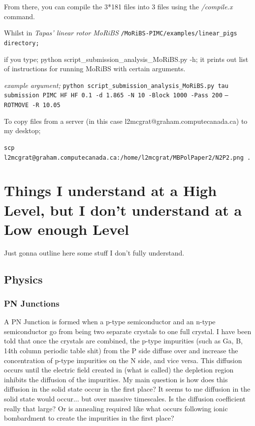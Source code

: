 \documentclass{article}
\newcounter{subsubsubsection}[subsubsection]
\begin{document}
From there, you can compile the 3*181 files into 3 files using the \textit{/compile.x} command.  


Whilst in \textit{Tapas' linear rotor MoRiBS} \texttt{/MoRiBS-PIMC/examples/linear\_pigs directory;} 

if you type; python script\_submission\_analysis\_MoRiBS.py -h;  
it prints out list of instructions for running MoRiBS with certain arguments.

\textit{example argument;}  \texttt{python script\_submission\_analysis\_MoRiBS.py tau submission PIMC HF HF 0.1 -d 1.865 -N 10 -Block 1000 -Pass 200}
\texttt{--ROTMOVE -R 10.05}

\vspace{0.5cm}

To copy files from a server (in this case l2mcgrat@graham.computecanada.ca) to my desktop;

\texttt{scp l2mcgrat@graham.computecanada.ca:/home/l2mcgrat/MBPolPaper2/N2P2.png .}


\section{Things I understand at a High Level, but I don't understand at a Low enough Level}

Just gonna outline here some stuff I don't fully understand.

\subsection{Physics}

\subsubsection{PN Junctions}

A PN Junction is formed when a p-type semiconductor and an n-type semiconductor go from being two separate crystals to one full crystal. I have been told that once the crystals are combined, the p-type impurities (such as Ga, B, 14th column periodic table shit) from the P side diffuse over and increase the concentration of p-type impurities on the N side, and vice versa. This diffusion occurs until the electric field created in (what is called) the depletion region inhibits the diffusion of the impurities. My main question is how does this diffusion in the solid state occur in the first place? It seems to me diffusion in the solid state would occur... but over massive timescales. Is the diffusion coefficient really that large? Or is annealing required like what occurs following ionic bombardment to create the impurities in the first place?
\end{document}
